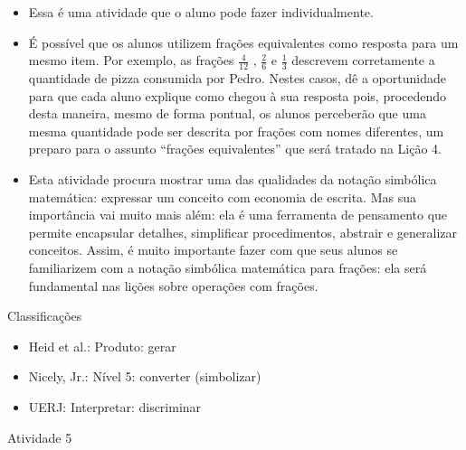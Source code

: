 \documentclass[oneside]{book}
\begin{document}
\begin{multicols}{2}
  \vspace{.1cm} 
  
  \vspace{.1cm}

  \begin{itemize} %
    \item       Essa é uma atividade que o aluno pode fazer individualmente.
    \item       É possível que os alunos utilizem frações equivalentes como resposta para um mesmo item. Por exemplo, as frações       $\frac{4}{12}$      ,       $\frac{2}{6}$       e       $\frac{1}{3}$        descrevem corretamente a quantidade de pizza consumida por Pedro. Nestes casos, dê a oportunidade para que cada aluno explique como chegou à sua resposta pois, procedendo desta maneira, mesmo de forma pontual, os alunos perceberão que uma mesma quantidade pode ser descrita por frações com nomes diferentes, um preparo para o assunto       ``frações equivalentes''       que será tratado na Lição 4.
    \item       Esta atividade procura mostrar uma das qualidades da notação simbólica matemática: expressar um conceito com economia de escrita. Mas sua importância vai muito mais além: ela é uma ferramenta de pensamento que permite encapsular detalhes, simplificar procedimentos, abstrair e generalizar conceitos. Assim, é muito importante fazer com que seus alunos se familiarizem com a notação simbólica matemática para frações: ela será fundamental nas lições sobre operações com frações.
\end{itemize} %


  Classificações
\begin{itemize} %
    \item       Heid et al.: Produto: gerar
    \item       Nicely, Jr.: Nível 5: converter (simbolizar)
    \item       UERJ: Interpretar: discriminar
\end{itemize} %





\begin{resposta*}{Atividade 5}


    \begin{tabular}{m{}m{}m{}m{}}
      

\end{tabular}
\end{resposta*}
\end{multicols}
\end{document}
